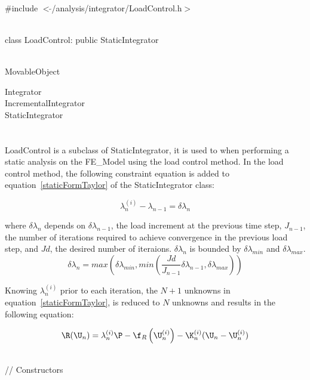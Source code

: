 
   \\
\#include $<\tilde{ }$/analysis/integrator/LoadControl.h$>$  


  \\
class LoadControl: public StaticIntegrator  


 \\
MovableObject 

\indent\indent Integrator \\
\indent\indent\indent IncrementalIntegrator \\
\indent\indent\indent\indent StaticIntegrator \\
\indent\indent\indent\indent{} \\

 \\ 
\indent LoadControl is a subclass of StaticIntegrator, it is
used to when performing a static analysis on the FE\_Model using the
load control method. In the load control method, the following
constraint equation is added to equation~\ref{staticFormTaylor} of the
StaticIntegrator class: 

\[ 
\lambda_n^{(i)} - \lambda_{n-1} = \delta \lambda_n
\]

\noindent where $\delta \lambda_n$ depends on $\delta \lambda_{n-1}$,
the load increment at the previous time step, $J_{n-1}$,
the number of iterations required to achieve convergence in the
previous load step, and $Jd$, the desired number of iteraions. $\delta
\lambda_n$ is bounded by $\delta \lambda_{min}$  and $\delta \lambda_{max}$. \\


\[ 
\delta \lambda_n = max \left( \delta \lambda_{min}, min \left(
\frac{Jd}{J_{n-1}} \delta \lambda_{n-1}, \delta \lambda_{max} \right) \right)
\]

Knowing $\lambda_n^{(i)}$ prior to each iteration, the $N+1$ unknowns
in equation~\ref{staticFormTaylor}, is reduced to $N$ unknowns and
results in the following equation:

\begin{equation} 
\R(\U_{n}) = \lambda_n^{(i)} \P 
 - \f_{R}\left(\U_{n}^{(i)} \right) - 
\K_n^{(i)} 
(\U_{n} - \U_{n}^{(i)})  
\label{staticFormLoadControl}
\end{equation} 

 \\
// Constructors 


